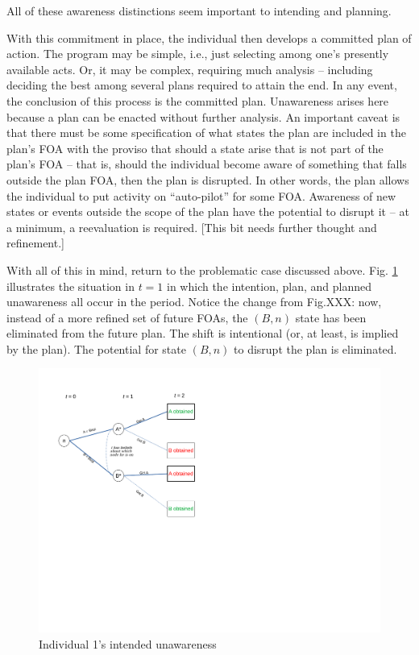 \documentclass[
11pt,
titlepage,
reqno,
]{article}%
\theoremstyle{definition}
\begin{document}
All of these awareness distinctions seem important to intending and planning.  

With this commitment in place, the individual then develops a committed plan of action. The program may be simple, i.e., just selecting among one's presently available acts. Or, it may be complex, requiring much analysis -- including deciding the best among several plans required to attain the end. In any event, the conclusion of this process is the committed plan. Unawareness arises here because a plan can be enacted without further analysis. An important caveat is that there must be some specification of what states the plan are included in the plan's FOA with the proviso that should a state arise that is not part of the plan's FOA -- that is, should the individual become aware of something that falls outside the plan FOA, then the plan is disrupted. In other words, the plan allows the individual to put activity on ``auto-pilot'' for some FOA. Awareness of new states or events outside the scope of the plan have the potential to disrupt it -- at a minimum, a reevaluation is required. [This bit needs further thought and refinement.]

With all of this in mind, return to the problematic case discussed above. Fig. \ref{Diag: p-11} illustrates the situation in $t=1$ in which the intention, plan, and planned unawareness all occur in the period. Notice the change from Fig.XXX: now, instead of a more refined set of future FOAs, the  $(B,n)$ state has been eliminated from the future plan. The shift is intentional (or, at least, is implied by the plan). The potential for state $(B,n)$ to disrupt the plan is eliminated. 

\begin{figure}[h!]
	\centering
	\includegraphics*[page=11,trim = 0in 4in 3in 0in,scale=.65]{Awareness_Diagrams_All}
	\caption{Individual 1's intended unawareness\label{Diag: p-11}}%
\end{figure}
\end{document}
